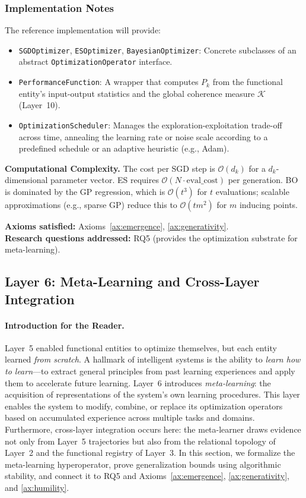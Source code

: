 \subsubsection{Implementation Notes}
The reference implementation will provide:
\begin{itemize}
    \item \texttt{SGDOptimizer}, \texttt{ESOptimizer}, \texttt{BayesianOptimizer}: Concrete subclasses of an abstract \texttt{OptimizationOperator} interface.
    \item \texttt{PerformanceFunction}: A wrapper that computes $P_k$ from the functional entity's input-output statistics and the global coherence measure $\mathcal{K}$ (Layer~10).
    \item \texttt{OptimizationScheduler}: Manages the exploration-exploitation trade-off across time, annealing the learning rate or noise scale according to a predefined schedule or an adaptive heuristic (e.g., Adam).
\end{itemize}

\textbf{Computational Complexity.} The cost per SGD step is $\mathcal{O}(d_k)$ for a $d_k$-dimensional parameter vector. ES requires $\mathcal{O}(N \cdot \text{eval\_cost})$ per generation. BO is dominated by the GP regression, which is $\mathcal{O}(t^3)$ for $t$ evaluations; scalable approximations (e.g., sparse GP) reduce this to $\mathcal{O}(t m^2)$ for $m$ inducing points.

\textbf{Axioms satisfied:} Axioms~\ref{ax:emergence}, \ref{ax:generativity}. \\
\textbf{Research questions addressed:} RQ5 (provides the optimization substrate for meta-learning).

\subsection{Layer 6: Meta-Learning and Cross-Layer Integration}
\label{subsec:layer6}

\paragraph{Introduction for the Reader.}
Layer~5 enabled functional entities to optimize themselves, but each entity learned \emph{from scratch}. A hallmark of intelligent systems is the ability to \emph{learn how to learn}---to extract general principles from past learning experiences and apply them to accelerate future learning. Layer~6 introduces \emph{meta-learning}: the acquisition of representations of the system's own learning procedures. This layer enables the system to modify, combine, or replace its optimization operators based on accumulated experience across multiple tasks and domains. Furthermore, cross-layer integration occurs here: the meta-learner draws evidence not only from Layer~5 trajectories but also from the relational topology of Layer~2 and the functional registry of Layer~3. In this section, we formalize the meta-learning hyperoperator, prove generalization bounds using algorithmic stability, and connect it to RQ5 and Axioms~\ref{ax:emergence}, \ref{ax:generativity}, and \ref{ax:humility}.

